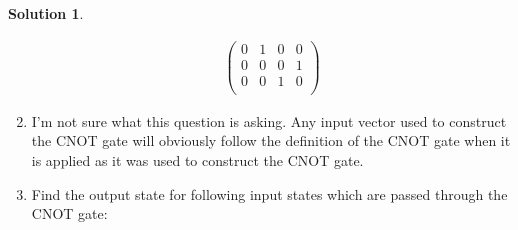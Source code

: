 \documentclass[10pt]{article}
\theoremstyle{definition}
\newtheorem{soln}{Solution}
\begin{document}
\begin{soln}
\begin{enumerate}[label=(\roman*)]
\begin{align*}
\begin{pmatrix}
                                      0 & 1 & 0 & 0 \\
                                      0 & 0 & 0 & 1 \\
                                      0 & 0 & 1 & 0 \\
                                    \end{pmatrix}
          \end{align*}
    \item I'm not sure what this question is asking. Any input vector used to construct the CNOT gate will obviously follow the definition of the
          CNOT gate when it is applied as it was used to construct the CNOT gate.
    \item Find the output state for following input states which are passed through the CNOT
          gate:
\end{enumerate}
\end{soln}
\end{document}
